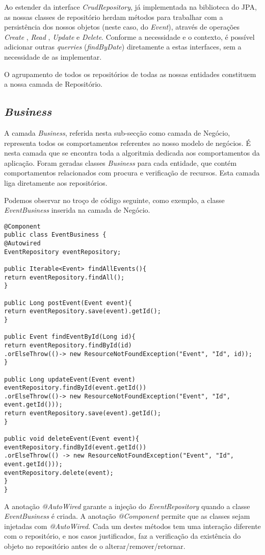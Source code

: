Ao estender da interface \emph{CrudRepository}, já implementada na biblioteca do JPA, as nossas classes de repositório herdam métodos para trabalhar com a persistência dos nossos objetos (neste caso, do \emph{Event}), através de operações \emph{Create} , \emph{Read} , \emph{Update} e \emph{Delete}. Conforme a necessidade e o contexto, é possível adicionar
outras \emph{querries} (\emph{findByDate}) diretamente a estas interfaces, sem a necessidade de as implementar. 

O agrupamento de todos os repositórios de todas as nossas entidades constituem a nossa camada de Repositório.
\subsection{\emph{Business}} \label{sec313}
A camada \emph{Business}, referida nesta sub-secção como camada de Negócio, representa todos os comportamentos referentes ao nosso modelo de negócios.
É nesta camada que se encontra toda a algoritmia dedicada aos comportamentos da aplicação. Foram geradas classes \emph{Business} para cada entidade, que contém comportamentos relacionados com procura e verificação de recursos. Esta camada liga diretamente aos repositórios.

Podemos observar no troço de código seguinte, como exemplo, a classe \emph{EventBusiness} inserida na camada de Negócio.
\begin{verbatim}
@Component
public class EventBusiness {
@Autowired
EventRepository eventRepository;

public Iterable<Event> findAllEvents(){
return eventRepository.findAll();
}

public Long postEvent(Event event){
return eventRepository.save(event).getId();
}

public Event findEventById(Long id){
return eventRepository.findById(id)
.orElseThrow(()-> new ResourceNotFoundException("Event", "Id", id));
}

public Long updateEvent(Event event)
eventRepository.findById(event.getId())
.orElseThrow(()-> new ResourceNotFoundException("Event", "Id", event.getId()));
return eventRepository.save(event).getId();
}

public void deleteEvent(Event event){
eventRepository.findById(event.getId())
.orElseThrow(() -> new ResourceNotFoundException("Event", "Id", event.getId()));
eventRepository.delete(event);
}
}
\end{verbatim}

A anotação \emph{@AutoWired} garante a injeção do \emph{EventRepository} quando a classe \emph{EventBusiness} é criada. A anotação \emph{@Component} permite que as classes sejam injetadas com \emph{@AutoWired}. Cada um destes métodos tem uma interação diferente com o repositório, e nos casos justificados, faz a verificação da existência do objeto no repositório antes de o alterar/remover/retornar.

